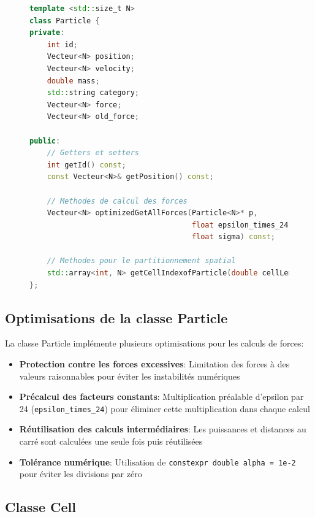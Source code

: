 \documentclass[12pt,a4paper]{article}
\begin{document}
\begin{figure}[H]
\begin{lstlisting}[language=C++, caption=Extrait de la classe Particle]
template <std::size_t N>
class Particle {
private:
    int id;
    Vecteur<N> position;
    Vecteur<N> velocity;
    double mass;
    std::string category;
    Vecteur<N> force;
    Vecteur<N> old_force;

public:
    // Getters et setters
    int getId() const;
    const Vecteur<N>& getPosition() const;
    
    // Methodes de calcul des forces
    Vecteur<N> optimizedGetAllForces(Particle<N>* p, 
                                     float epsilon_times_24,
                                     float sigma) const;
    
    // Methodes pour le partitionnement spatial
    std::array<int, N> getCellIndexofParticle(double cellLength) const;
};
\end{lstlisting}
\end{figure}

\subsection{Optimisations de la classe Particle}

La classe Particle implémente plusieurs optimisations pour les calculs de forces:

\begin{itemize}
    \item \textbf{Protection contre les forces excessives}: Limitation des forces à des valeurs raisonnables pour éviter les instabilités numériques
    \item \textbf{Précalcul des facteurs constants}: Multiplication préalable d'epsilon par 24 (\texttt{epsilon\_times\_24}) pour éliminer cette multiplication dans chaque calcul
    \item \textbf{Réutilisation des calculs intermédiaires}: Les puissances et distances au carré sont calculées une seule fois puis réutilisées
    \item \textbf{Tolérance numérique}: Utilisation de \texttt{constexpr double alpha = 1e-2} pour éviter les divisions par zéro
\end{itemize}

\subsection{Classe Cell}
\end{document}
